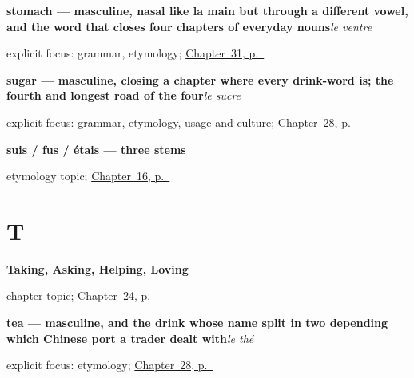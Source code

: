 \noindent\begin{minipage}[t]{\linewidth}
\raggedright
\textbf{stomach — masculine, nasal like la main but through a different vowel, and the word that closes four chapters of everyday nouns}\enspace\emph{le ventre}\par
\footnotesize explicit focus: grammar, etymology; \hyperref[ch:fr-eyes-nose-mouth-stomach]{Chapter~31, p.~\pageref*{ch:fr-eyes-nose-mouth-stomach}}
\end{minipage}\par\smallskip

\noindent\begin{minipage}[t]{\linewidth}
\raggedright
\textbf{sugar — masculine, closing a chapter where every drink-word is; the fourth and longest road of the four}\enspace\emph{le sucre}\par
\footnotesize explicit focus: grammar, etymology, usage and culture; \hyperref[ch:fr-coffee-tea-milk-sugar]{Chapter~28, p.~\pageref*{ch:fr-coffee-tea-milk-sugar}}
\end{minipage}\par\smallskip

\noindent\begin{minipage}[t]{\linewidth}
\raggedright
\textbf{suis / fus / étais — three stems}\par
\footnotesize etymology topic; \hyperref[ch:etre]{Chapter~16, p.~\pageref*{ch:etre}}
\end{minipage}\par\smallskip

\section*{T}

\noindent\begin{minipage}[t]{\linewidth}
\raggedright
\textbf{Taking, Asking, Helping, Loving}\par
\footnotesize chapter topic; \hyperref[ch:fr-taking-asking-helping-loving]{Chapter~24, p.~\pageref*{ch:fr-taking-asking-helping-loving}}
\end{minipage}\par\smallskip

\noindent\begin{minipage}[t]{\linewidth}
\raggedright
\textbf{tea — masculine, and the drink whose name split in two depending which Chinese port a trader dealt with}\enspace\emph{le thé}\par
\footnotesize explicit focus: etymology; \hyperref[ch:fr-coffee-tea-milk-sugar]{Chapter~28, p.~\pageref*{ch:fr-coffee-tea-milk-sugar}}
\end{minipage}\par\smallskip

